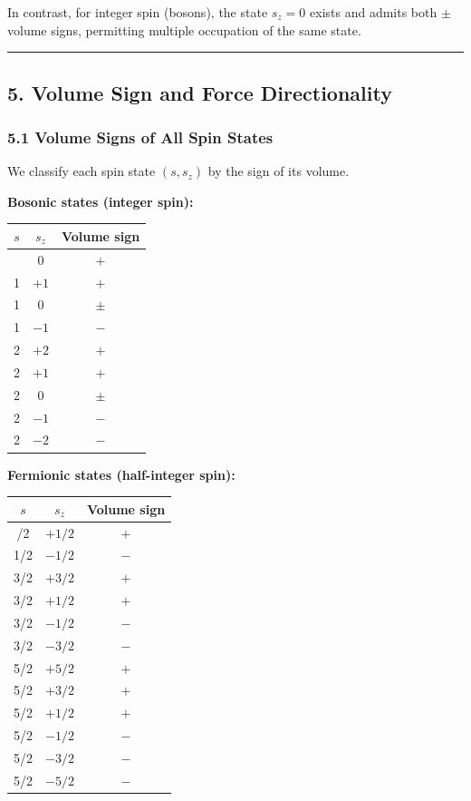 \documentclass[a4paper,11pt]{article}
\newcounter{none}
\begin{document}
In contrast, for integer spin (bosons), the state $s_z = 0$ exists and admits both $\pm$ volume signs, permitting multiple occupation of the same state.

\begin{center}\rule{0.5\linewidth}{0.5pt}\end{center}

\subsection*{5. Volume Sign and Force Directionality}

\subsubsection*{5.1 Volume Signs of All Spin States}

We classify each spin state $(s, s_z)$ by the sign of its volume.

\textbf{Bosonic states (integer spin):}

{\def\LTcaptype{none}
\begin{longtable}[]{@{}ccc@{}}
\toprule
$s$ & $s_z$ & Volume sign \\
\midrule
\endhead
\bottomrule
\endlastfoot
0 & 0 & $+$ \\
1 & $+1$ & $+$ \\
1 & $0$ & $\pm$ \\
1 & $-1$ & $-$ \\
2 & $+2$ & $+$ \\
2 & $+1$ & $+$ \\
2 & $0$ & $\pm$ \\
2 & $-1$ & $-$ \\
2 & $-2$ & $-$ \\
\end{longtable}
}

\textbf{Fermionic states (half-integer spin):}

{\def\LTcaptype{none}
\begin{longtable}[]{@{}ccc@{}}
\toprule
$s$ & $s_z$ & Volume sign \\
\midrule
\endhead
\bottomrule
\endlastfoot
1/2 & $+1/2$ & $+$ \\
1/2 & $-1/2$ & $-$ \\
3/2 & $+3/2$ & $+$ \\
3/2 & $+1/2$ & $+$ \\
3/2 & $-1/2$ & $-$ \\
3/2 & $-3/2$ & $-$ \\
5/2 & $+5/2$ & $+$ \\
5/2 & $+3/2$ & $+$ \\
5/2 & $+1/2$ & $+$ \\
5/2 & $-1/2$ & $-$ \\
5/2 & $-3/2$ & $-$ \\
5/2 & $-5/2$ & $-$ \\
\end{longtable}
}
\end{document}
